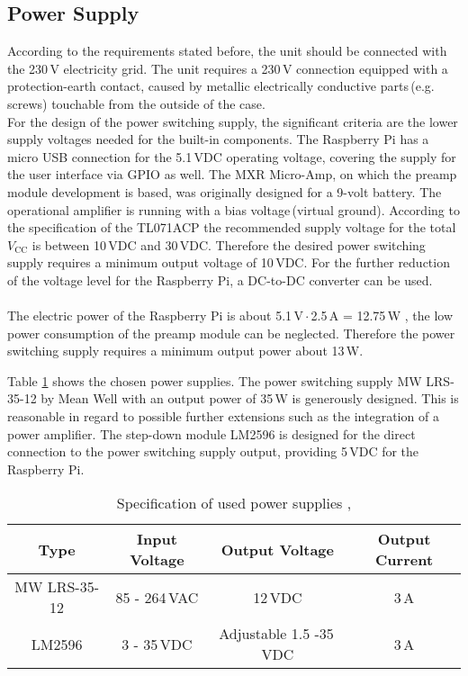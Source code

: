 \subsection{Power Supply}

According to the requirements stated before, the unit should be connected with the 230\,V electricity grid.
The unit requires a 230\,V connection equipped with a protection-earth contact, caused by metallic electrically conductive parts\,(e.g. screws) touchable from the outside of the case.
\\
For the design of the power switching supply, the significant criteria are the lower supply voltages needed for the built-in components.
The Raspberry Pi has a micro USB connection for the 5.1\,VDC operating voltage, covering the supply for the user interface via GPIO as well.
The MXR Micro-Amp, on which the preamp module development is based, was originally  designed for a 9-volt battery.
The operational amplifier is running with a bias voltage\,(virtual ground).
According to the specification of the TL071ACP \citep{Tl071:2017} the recommended supply voltage for the total $V_{\mathrm{CC}}$ is between 10\,VDC and 30\,VDC.
Therefore the desired power switching supply requires a minimum output voltage of 10\,VDC.
For the further reduction of the voltage level for the Raspberry Pi, a DC-to-DC converter can be used.
\\
\\
The electric power of the Raspberry Pi is about 5.1\,V\,$\cdot$\,2.5\,A = 12.75\,W \cite{Pi:2005}, the low power consumption of the preamp module can be neglected. Therefore the power switching supply requires a minimum output power about 13\,W.

Table \ref{tab:PowerSupplyChoice} shows the chosen power supplies. The power switching supply MW LRS-35-12 by Mean Well with an output power of 35\,W is generously designed. This is reasonable in regard to possible further extensions such as the integration of a power amplifier. The step-down module LM2596 is designed for the direct connection to the power switching supply output, providing 5\,VDC for the Raspberry Pi.
\\


\begin{table}[H]
\begin{center}
\begin{tabular}{|c|c|c|c|}
\hline 
\textbf{Type}  & \textbf{Input Voltage}  & \textbf{Output Voltage}  & \textbf{Output Current}  \\ 
\hline 
\hline
MW LRS-35-12 & 85 - 264\,VAC   & 12\,VDC &  3\,A \\ 
\hline 
LM2596 & 3 - 35\,VDC & Adjustable 1.5 -35\,VDC &  3\,A \\ 
\hline 
\end{tabular} 
\caption{Specification of used power supplies \cite{MWLRS35:2016}, \cite{DCDC:2017}}
\end{center}
\label{tab:PowerSupplyChoice}
\end{table}

